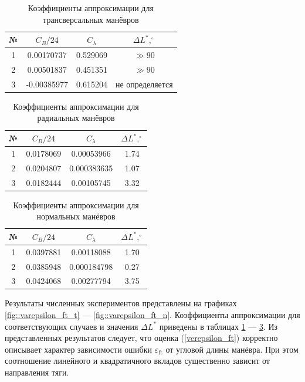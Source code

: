 \begin{table}[h!]
\centering
\caption{Коэффициенты аппроксимации для трансверсальных манёвров}
\label{tab::transverse_fit_coeffs}
\begin{tabular}{|c|c|c|c|}
    \hline
    № & $C_B / 24$ & $C_\lambda$ & $\Delta L^*, ^\circ$ \\
    \hline
    1 & 0.00170737  & 0.529069 & $\gg 90$ \\
    \hline
    2 & 0.00501837  & 0.451351 & $\gg 90$ \\
    \hline
    3 & -0.00385977 & 0.615204 & не определяется \\
    \hline
\end{tabular}
\end{table}
\begin{table}[h!]
\centering
\caption{Коэффициенты аппроксимации для радиальных манёвров}
\label{tab::radial_fit_coeffs}
\begin{tabular}{|c|c|c|c|}
    \hline
    № & $C_B / 24$ & $C_\lambda$ & $\Delta L^*, ^\circ$ \\
    \hline
    1 & 0.0178069 & 0.00053966  & 1.74 \\
    \hline
    2 & 0.0204807 & 0.000383635 & 1.07 \\
    \hline
    3 & 0.0182444 & 0.00105745  & 3.32 \\
    \hline
\end{tabular}
\end{table}
\begin{table}[h!]
\centering
\caption{Коэффициенты аппроксимации для нормальных манёвров}
\label{tab::normal_fit_coeffs}
\begin{tabular}{|c|c|c|c|}
    \hline
    № & $C_B / 24$ & $C_\lambda$ & $\Delta L^*, ^\circ$ \\
    \hline
    1 & 0.0397881 & 0.00118088  & 1.70 \\
    \hline
    2 & 0.0385948 & 0.000184798 & 0.27 \\
    \hline
    3 & 0.0424068 & 0.00277794  & 3.75 \\
    \hline
\end{tabular}
\end{table}

Результаты численных экспериментов представлены на графиках \ref{fig::varepsilon_ft_t} --- \ref{fig::varepsilon_ft_n}. Коэффициенты аппроксимации для соответствующих случаев и значения $\Delta L^*$ приведены в таблицах \ref{tab::transverse_fit_coeffs} --- \ref{tab::normal_fit_coeffs}. Из представленных результатов следует, что оценка (\ref{verepsilon_ft}) корректно описывает характер зависимости ошибки $\varepsilon_{\text{ft}}$ от угловой длины манёвра. При этом соотношение линейного и квадратичного вкладов существенно зависит от направления тяги.

